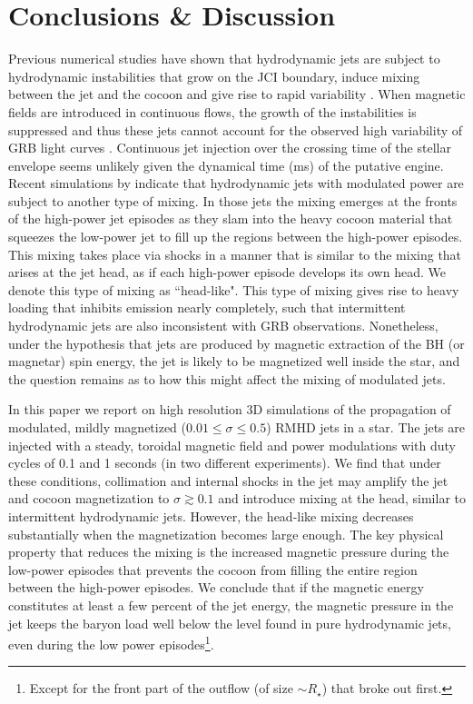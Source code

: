 \documentclass[fleqn,usenatbib]{mnras}
\begin{document}
	\section{Conclusions \& Discussion}
	\label{sec:discussion}
	
	Previous numerical studies have shown that hydrodynamic jets are subject to hydrodynamic instabilities that grow on the JCI boundary, induce mixing between the jet and the cocoon and give rise to rapid variability \citep{Gottlieb2019}. When magnetic fields are introduced in continuous flows, the growth of the instabilities is suppressed and thus these jets cannot account for the observed high variability of GRB light curves \citep{Gottlieb2020b}.
	Continuous jet injection over the crossing time of the stellar envelope seems unlikely given the dynamical time (ms) of the putative engine.
	Recent simulations by \citet{Gottlieb2020a} indicate that hydrodynamic jets with modulated power are subject to another type of mixing. In those jets the mixing emerges at the fronts of the high-power jet episodes as they slam into the heavy cocoon material that squeezes the low-power jet to fill up the regions between the high-power episodes. This mixing takes place via shocks in a manner that is similar to the mixing that arises at the jet head, as if each high-power episode develops its own head. We denote this type of mixing as ``head-like".
	This type of mixing gives rise to heavy loading that inhibits emission nearly completely, such that intermittent hydrodynamic jets are also inconsistent with GRB observations.
	Nonetheless, under the hypothesis that jets are produced by magnetic extraction of the BH (or magnetar) spin energy, the jet is likely to be 
	magnetized well inside the star, and the question remains as to how this might affect the mixing of modulated jets.

	In this paper we report on high resolution 3D simulations of the propagation of modulated, mildly magnetized ($0.01\le\sigma\le 0.5$) RMHD jets in a star.  The jets are injected with a steady, toroidal magnetic field and power modulations with duty cycles of 0.1 and 1 seconds (in two different experiments).
	We find that under these conditions, collimation and internal shocks in the jet may amplify the jet and cocoon magnetization to $ \sigma \gtrsim 0.1 $ and introduce mixing at the head, similar to intermittent hydrodynamic jets. However, the head-like mixing decreases substantially when the magnetization becomes large enough. The key physical property that reduces the mixing is the increased magnetic pressure during the low-power episodes that prevents the cocoon from filling the entire region between the high-power episodes.
	We conclude that if the magnetic energy constitutes at least a few percent of the jet energy, the magnetic pressure in the jet keeps the baryon load well below the level found in pure hydrodynamic jets, even during the low power episodes\footnote{Except for the front part of the outflow (of size $ \sim R_\star $) that broke out first.}.
\end{document}
